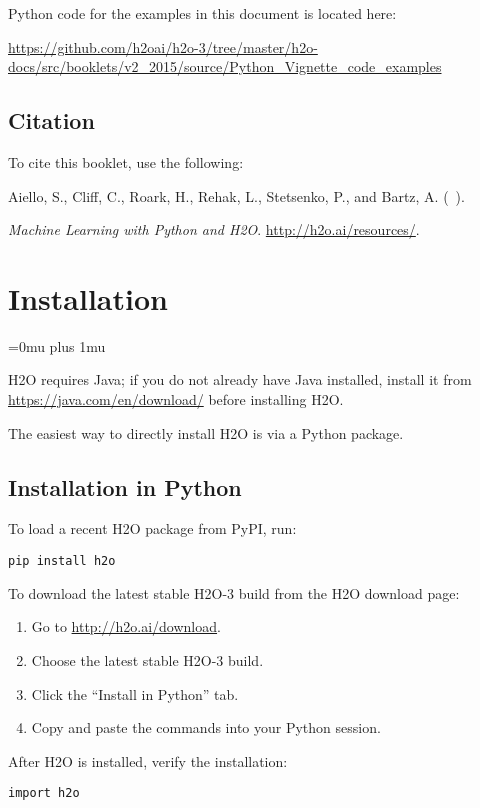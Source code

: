 Python code for the examples in this document is located here:

\url{https://github.com/h2oai/h2o-3/tree/master/h2o-docs/src/booklets/v2_2015/source/Python_Vignette_code_examples}

\subsection{Citation}

To cite this booklet, use the following: 

Aiello, S., Cliff, C., Roark, H., Rehak, L., Stetsenko, P., and Bartz, A. (\shortmonthname\ \the\year). {\textit{Machine Learning with Python and H2O}. {\url{http://h2o.ai/resources/}}.


\section{Installation} 
\Urlmuskip=0mu plus 1mu\relax %

H2O requires Java; if you do not already have Java installed, install it from {\url{https://java.com/en/download/}} before installing H2O. 

The easiest way to directly install H2O is  via a Python package.

\subsection{Installation in Python}

To load a recent H2O package from PyPI, run:

{\texttt{pip install h2o}}

To download the
latest stable H2O-3 build from the H2O download page:

\begin{enumerate}
\item Go to {\url{http://h2o.ai/download}}.
\item Choose the latest stable H2O-3 build.
\item Click the ``Install in Python'' tab.
\item Copy and paste the commands into your Python session.
\end{enumerate}

After H2O is installed, verify the installation:

\begin{lstlisting}[style=pythoncode]
import h2o


\end{lstlisting}}
